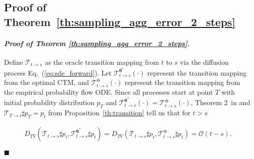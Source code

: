 \documentclass{article} \usepackage{iclr2024_coNFErence,times}
\def\eqref#1{equation~\ref{#1}}
\newenvironment{myproof}[2]{\paragraph{\textit{Proof of {#1} {#2}. }}}{\hfill$\blacksquare$}
\def\eqref#1{(\ref{#1})}
\def\eqref#1{(\ref{#1})}
\theoremstyle{definition}
\theoremstyle{remark}
\begin{document}
\subsection{Proof of Theorem~\ref{th:sampling_agg_error_2_steps}}



\begin{myproof}{Theorem}{\ref{th:sampling_agg_error_2_steps}}
Define $\mathcal{T}_{t\rightarrow s}$ as the oracle transition mapping from $t$ to $s$ via the diffusion process Eq.~\eqref{eq:sde_forward}. Let $\mathcal{T}_{t\rightarrow s}^{\bm{\theta}^*}(\cdot)$ represent the transition mapping from the optimal CTM, and $\mathcal{T}_{t\rightarrow s}^{\bm{\phi}}(\cdot)$ represent the transition mapping from the empirical probability flow ODE. 
Since all processes start at point $T$ with initial probability distribution $p_T$ and $\mathcal{T}_{t\rightarrow s}^{\bm{\theta}^*}(\cdot)=\mathcal{T}_{t\rightarrow s}^{\bm{\phi}}(\cdot)$, Theorem 2~in \citep{chen2022sampling} and $\mathcal{T}_{T\rightarrow t}\sharp p_T=p_t$ from Proposition~\ref{th:transition} tell us that for $t>s$

\begin{align}\label{eq:tv_error_1_step}
    D_{TV}\left(\mathcal{T}_{t\rightarrow s}\sharp p_t, \mathcal{T}_{t\rightarrow s}^{\bm{\theta}^*}\sharp p_t\right) 
    = D_{TV}\left(\mathcal{T}_{t\rightarrow s}\sharp p_t, \mathcal{T}_{t\rightarrow s}^{\bm{\phi}}\sharp p_t\right)=\mathcal{O}(t-s).
\end{align}


\end{myproof}
\end{document}
